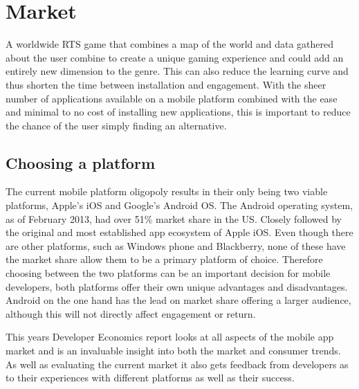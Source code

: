 \section{Market}

A worldwide RTS game that combines a map of the world and data gathered about the user combine to create a unique gaming experience and could add an entirely new dimension to the genre. This can also reduce the learning curve and thus shorten the time between installation and engagement. With the sheer number of applications available on a mobile platform combined with the ease and minimal to no cost of installing new applications, this is important to reduce the chance of the user simply finding an alternative.

\subsection{Choosing a platform}
The current mobile platform oligopoly results in their only being two viable platforms, Apple's iOS and Google's Android OS. The Android operating system, as of February 2013, had over 51\% market share in the US\cite{smartphone_market}. Closely followed by the original and most established app ecosystem of Apple iOS. Even though there are other platforms, such as Windows phone and Blackberry, none of these have the market share allow them to be a primary platform of choice. Therefore choosing between the two platforms can be an important decision for mobile developers, both platforms offer their own unique advantages and disadvantages. Android on the one hand has the lead on market share offering a larger audience, although this will not directly affect engagement or return.

This years Developer Economics report\cite{de} looks at all aspects of the mobile app market and is an invaluable insight into both the market and consumer trends. As well as evaluating the current market it also gets feedback from developers as to their experiences with different platforms as well as their success.

